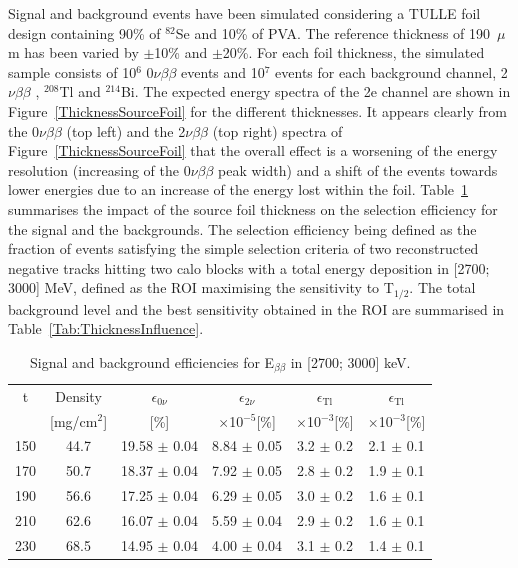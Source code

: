 \documentclass[main.tex]{subfiles}
\begin{document}
\NI Signal and background events have been simulated considering a TULLE foil design containing 90\% of $^{\text{82}}$Se and 10\% of PVA. The reference thickness of 190~$\mu$m has been varied by $\pm$10\% and $\pm$20\%. For each foil thickness, the simulated sample consists of 10$^\text{6}$ 0$\nu\beta\beta$ events and 10$^\text{7}$ events for each background channel, 2$\nu\beta\beta$ , $^{\text{208}}$Tl and $^{\text{214}}$Bi. The expected energy spectra of the 2e channel are shown in Figure~\ref{ThicknessSourceFoil} for the different thicknesses. It appears clearly from the 0$\nu\beta\beta$ (top left) and the 2$\nu\beta\beta$ (top right) spectra of Figure~\ref{ThicknessSourceFoil} that the overall effect is a worsening of the energy resolution (increasing of the 0$\nu\beta\beta$ peak width) and a shift of the events towards lower energies due to an increase of the energy lost within the foil. Table~\ref{tab:SignalBkgDifferentThickness} summarises the impact of the source foil thickness on the selection efficiency for the signal and the backgrounds. The selection efficiency being defined as the fraction of events satisfying the simple selection criteria of two reconstructed negative tracks hitting two calo blocks with a total energy deposition in [2700; 3000] MeV, defined as the ROI maximising the sensitivity to T$_{\text{1/2}}$. The total background level and the best sensitivity obtained in the ROI are summarised in Table~\ref{Tab:ThicknessInfluence}.



\begin{table}
\centering
\begin{tabular}{c|c|c|c|c|c}
\toprule
t & Density & $\epsilon_{\text{0}\nu}$ & $\epsilon_{\text{2}\nu}$ & $\epsilon_{\text{Tl}}$ & $\epsilon_{\text{Tl}}$ \\[0.1cm] 
[$\mu$m] & [mg/cm$^\text{2}$] & [\%] & $\times$10$^{-\text{5}}$[\%] & $\times$10$^{-\text{3}}$[\%] & $\times$10$^{-\text{3}}$[\%] \\[0.1cm]
\hline
150 & 44.7 & 19.58 $\pm$ 0.04 & 8.84 $\pm$ 0.05 & 3.2 $\pm$ 0.2 & 2.1 $\pm$ 0.1 \\
\hline
170 & 50.7 & 18.37 $\pm$ 0.04 & 7.92 $\pm$ 0.05 & 2.8 $\pm$ 0.2 & 1.9 $\pm$ 0.1 \\
\hline
190 & 56.6 & 17.25 $\pm$ 0.04 & 6.29 $\pm$ 0.05 & 3.0 $\pm$ 0.2 & 1.6 $\pm$ 0.1 \\
\hline
210 & 62.6 & 16.07 $\pm$ 0.04 & 5.59 $\pm$ 0.04 & 2.9 $\pm$ 0.2 & 1.6 $\pm$ 0.1 \\
\hline
230 & 68.5 & 14.95 $\pm$ 0.04 & 4.00 $\pm$ 0.04 & 3.1 $\pm$ 0.2 & 1.4 $\pm$ 0.1 \\
\bottomrule
\end{tabular}
\caption{Signal and background efficiencies for E$_{\beta\beta}$ in [2700; 3000] keV.}
\label{tab:SignalBkgDifferentThickness}
\end{table}
\end{document}

